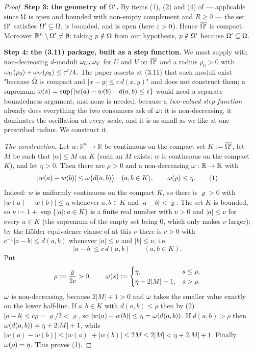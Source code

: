 \begin{proof}
\medskip\noindent\textbf{Step 3: the geometry of $\Omega'$.} By items (1), (2) and (4) of
 --- applicable since $\Omega$ is open and bounded with
non-empty complement and $R\ge0$ --- the set $\Omega'$ satisfies $\Omega'\subseteq\Omega$, is bounded,
and is open (here $\varepsilon>0$). Hence $\overline{\Omega'}$ is compact. Moreover
$\mathbb R^{n}\setminus\Omega'\ne\emptyset$: taking $p\notin\Omega$ from our hypothesis, $p\notin\Omega'$
because $\Omega'\subseteq\Omega$.

\medskip\noindent\textbf{Step 4: the (3.11) package, built as a step function.} We must
supply  with non-decreasing $d$-moduli $\omega_U,\omega_V$ for $U$
and $V$ on $\overline{\Omega'}$ and a radius $\rho_0>0$ with
$\omega_U(\rho_0)+\omega_V(\rho_0)\le\tau'/4$. The paper asserts at (3.11) that such moduli exist
"because $\bar{\Omega}$ is compact and $|x-y|\le c\,d(x,y)$" and does not construct them; a
supremum $\omega(s)=\sup\{|w(a)-w(b)|:d(a,b)\le s\}$ would need a separate boundedness argument,
and none is needed, because a \emph{two-valued step function} already does everything the two
consumers ask of $\omega$: it is non-decreasing, it dominates the oscillation at every scale,
and it is as small as we like at one prescribed radius. We construct it.

\emph{The construction.} Let $w:\mathbb R^{n}\to\mathbb R$ be continuous on the compact set
$K:=\overline{\Omega'}$, let $M$ be such that $|w|\le M$ on $K$ (such an $M$ exists: $w$ is
continuous on the compact $K$), and let $\eta>0$. Then there are $\rho>0$ and a
non-decreasing $\omega:\mathbb R\to\mathbb R$ with
\[
 |w(a)-w(b)|\le\omega\big(d(a,b)\big)\quad(a,b\in K),\qquad \omega(\rho)\le\eta . \tag{1}
\]
Indeed: $w$ is uniformly continuous on the compact $K$, so there is $\varrho>0$ with
$|w(a)-w(b)|\le\eta$ whenever $a,b\in K$ and $|a-b|<\varrho$. The set $K$ is bounded, so
$\nu:=1+\sup\{|a|:a\in K\}$ is a finite real number with $\nu>0$ and $|a|\le\nu$ for every
$a\in K$ (the supremum of the empty set being $0$, which only makes $\nu$ larger); by the
Hölder equivalence clause of
 at this $\nu$ there is $c>0$ with $c^{-1}|a-b|\le d(a,b)$ whenever
$|a|\le\nu$ and $|b|\le\nu$, i.e.
\[
 |a-b|\le c\,d(a,b)\qquad(a,b\in K). \tag{2}
\]
Put
\[
 \rho:=\frac{\varrho}{2c}>0,\qquad
 \omega(s):=\begin{cases}\eta,& s\le\rho,\\ \eta+2|M|+1,& s>\rho.\end{cases}
\]
$\omega$ is non-decreasing, because $2|M|+1>0$ and $\omega$ takes the smaller value exactly on the
lower half-line. If $a,b\in K$ with $d(a,b)\le\rho$ then by (2)
$|a-b|\le c\rho=\varrho/2<\varrho$, so $|w(a)-w(b)|\le\eta=\omega(d(a,b))$. If $d(a,b)>\rho$
then $\omega(d(a,b))=\eta+2|M|+1$, while
$|w(a)-w(b)|\le|w(a)|+|w(b)|\le2M\le2|M|<\eta+2|M|+1$. Finally $\omega(\rho)=\eta$. This proves
(1).


\end{proof}
